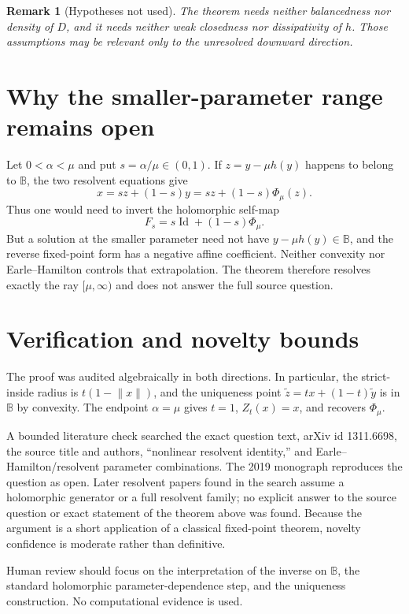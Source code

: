 \documentclass[11pt]{article}
\newtheorem{remark}{Remark}
\newcommand{\B}{\mathbb B}
\newcommand{\Id}{\operatorname{Id}}
\begin{document}
\begin{remark}[Hypotheses not used]
The theorem needs neither balancedness nor density of $D$, and it needs
neither weak closedness nor dissipativity of $h$.  Those assumptions may be
relevant only to the unresolved downward direction.
\end{remark}

\section{Why the smaller-parameter range remains open}

Let $0<\alpha<\mu$ and put $s=\alpha/\mu\in(0,1)$.  If
$z=y-\mu h(y)$ happens to belong to $\B$, the two resolvent equations give
\[
  x=s z+(1-s)y=s z+(1-s)\Phi_\mu(z).
\]
Thus one would need to invert the holomorphic self-map
\[
  F_s=s\Id+(1-s)\Phi_\mu.
\]
But a solution at the smaller parameter need not have
$y-\mu h(y)\in\B$, and the reverse fixed-point form has a negative affine
coefficient.  Neither convexity nor Earle--Hamilton controls that
extrapolation.  The theorem therefore resolves exactly the ray
$[\mu,\infty)$ and does not answer the full source question.

\section{Verification and novelty bounds}

The proof was audited algebraically in both directions.  In particular, the
strict-inside radius is $t(1-\lVert x\rVert)$, and the uniqueness point
$\widetilde z=t x+(1-t)\widetilde y$ is in $\B$ by convexity.  The endpoint
$\alpha=\mu$ gives $t=1$, $Z_t(x)=x$, and recovers $\Phi_\mu$.

A bounded literature check searched the exact question text, arXiv id
1311.6698, the source title and authors, ``nonlinear resolvent identity,'' and
Earle--Hamilton/resolvent parameter combinations.  The 2019 monograph
\cite{ERS} reproduces the question as open.  Later resolvent papers found in
the search assume a holomorphic generator or a full resolvent family; no
explicit answer to the source question or exact statement of the theorem
above was found.  Because the argument is a short application of a classical
fixed-point theorem, novelty confidence is moderate rather than definitive.

Human review should focus on the interpretation of the inverse on $\B$, the
standard holomorphic parameter-dependence step, and the uniqueness
construction.  No computational evidence is used.
\end{document}
